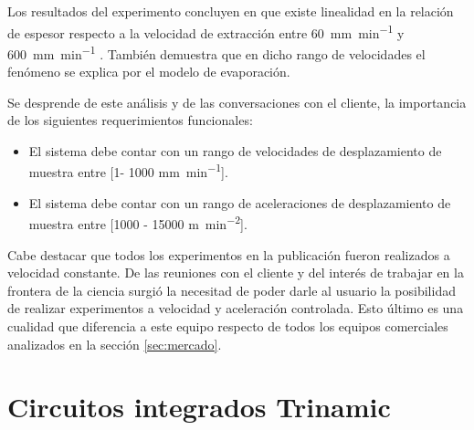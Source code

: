 

Los resultados del experimento concluyen en que existe linealidad en la relación de espesor respecto a la velocidad de extracción entre \SI{60}{\milli\meter\per\minute} y \SI{600}{\milli\meter\per\minute} . También demuestra que en dicho rango de velocidades el fenómeno se explica por el modelo de evaporación.

Se desprende de este análisis y de las conversaciones con el cliente, la importancia de los siguientes requerimientos funcionales:

\begin{itemize}
\item El sistema debe contar con un rango de velocidades de desplazamiento de muestra entre [1- 1000 \si{\milli\meter\per\minute}]. 
\item El sistema debe contar con un rango de aceleraciones de desplazamiento de muestra entre [1000 - 15000 \si{\meter\per\square\minute}].
		
\end{itemize}
	
Cabe destacar que todos los experimentos en la publicación fueron realizados a velocidad constante. De las reuniones con el cliente y del interés de trabajar en la frontera de la ciencia surgió la necesitad de poder darle al usuario la posibilidad de realizar experimentos a velocidad y aceleración controlada. Esto último es una cualidad que diferencia a este equipo respecto de todos los equipos comerciales analizados en la sección \ref{sec:mercado}.

 


\section{Circuitos integrados Trinamic}
\label{sec:Circuitos integrados Trinamic}

